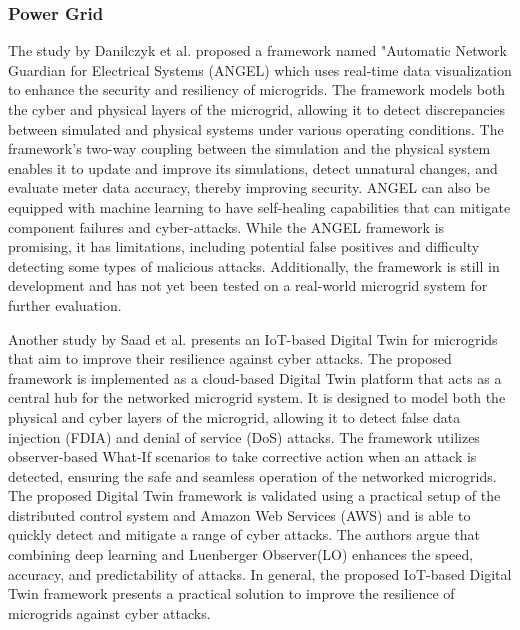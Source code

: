 

\subsubsection*{Power Grid}
The study by Danilczyk et al.\cite{williamdanilczykANGELIntelligentDigital2019} proposed a framework named "Automatic Network Guardian for Electrical Systems (ANGEL) which uses real-time data visualization to enhance the security and resiliency of microgrids. The framework models both the cyber and physical layers of the microgrid, allowing it to detect discrepancies between simulated and physical systems under various operating conditions. The framework's two-way coupling between the simulation and the physical system enables it to update and improve its simulations, detect unnatural changes, and evaluate meter data accuracy, thereby improving security. ANGEL can also be equipped with machine learning to have self-healing capabilities that can mitigate component failures and cyber-attacks. While the ANGEL framework is promising, it has limitations, including potential false positives and difficulty detecting some types of malicious attacks. Additionally, the framework is still in development and has not yet been tested on a real-world microgrid system for further evaluation.

Another study by Saad et al.\cite{saadImplementationIoTBasedDigital2020} presents an IoT-based Digital Twin for microgrids that aim to improve their resilience against cyber attacks. The proposed framework is implemented as a cloud-based Digital Twin platform that acts as a central hub for the networked microgrid system. It is designed to model both the physical and cyber layers of the microgrid, allowing it to detect false data injection (FDIA) and denial of service (DoS) attacks. The framework utilizes observer-based What-If scenarios to take corrective action when an attack is detected, ensuring the safe and seamless operation of the networked microgrids. The proposed Digital Twin framework is validated using a practical setup of the distributed control system and Amazon Web Services (AWS) and is able to quickly detect and mitigate a range of cyber attacks. The authors argue that combining deep learning and Luenberger Observer(LO) enhances the speed, accuracy, and predictability of attacks. In general, the proposed IoT-based Digital Twin framework presents a practical solution to improve the resilience of microgrids against cyber attacks.

